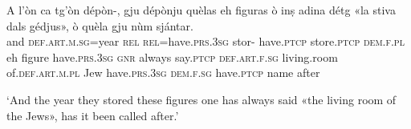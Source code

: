 \begin{linenumbers}
\gll A l’òn ca tg’òn dépòn-, gju dépònju quèlas eh figuras ò inṣ adina détg «la stiva dals gédjus», ò quèla gju nùm sjántar.   \\
and  \textsc{def.art.m.sg}=year \textsc{rel} \textsc{rel}=have.\textsc{prs.3sg} stor- have.\textsc{ptcp} store.\textsc{ptcp} \textsc{dem.f.pl} eh figure have.\textsc{prs.3sg} \textsc{gnr} always  say.\textsc{ptcp} \textsc{def.art.f.sg} living.room of.\textsc{def.art.m.pl} Jew have.\textsc{prs.3sg} \textsc{dem.f.sg} have.\textsc{ptcp} name after\\
\end{linenumbers}
\medskip
\glt `And the year they stored these figures one has always said «the living room of the Jews», has it been called after.'
\medskip

